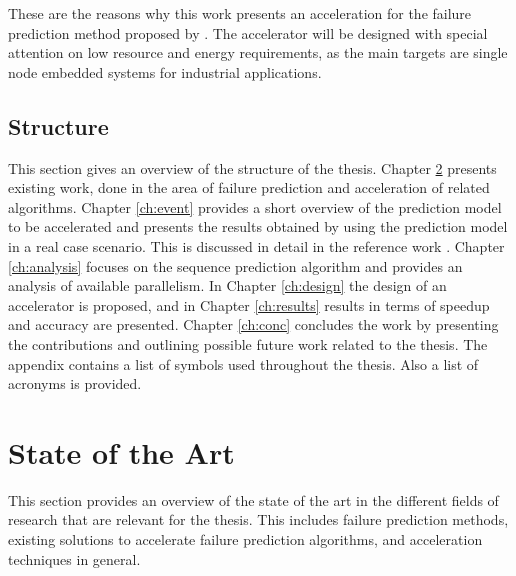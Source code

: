 \documentclass[mscthesis]{usiinfthesis}
\begin{document}
These are the reasons why this work presents an acceleration for the failure
prediction method proposed by \cite{salfner08}. The accelerator will be designed
with special attention on low resource and energy requirements, as the main
targets are single node embedded systems for industrial applications.

\section{Structure}
\label{ch:intro_struct}

This section gives an overview of the structure of the thesis. Chapter
\ref{ch:art} presents existing work, done in the area of failure prediction and
acceleration of related algorithms. Chapter \ref{ch:event} provides a short
overview of the prediction model to be accelerated and presents the results
obtained by using the prediction model in a real case scenario. This is
discussed in detail in the reference work \cite{salfner08}. Chapter
\ref{ch:analysis} focuses on the sequence prediction algorithm and provides an
analysis of available parallelism. In Chapter \ref{ch:design} the design of an
accelerator is proposed, and in Chapter \ref{ch:results} results in terms of
speedup and accuracy are presented. Chapter \ref{ch:conc} concludes the work
by presenting the contributions and outlining possible future work related to
the thesis. The appendix contains a list of symbols used throughout the thesis.
Also a list of acronyms is provided.

\chapter{State of the Art}
\label{ch:art}
\glsresetall %

This section provides an overview of the state of the art in the different
fields of research that are relevant for the thesis. This includes failure
prediction methods, existing solutions to accelerate failure prediction
algorithms, and acceleration techniques in general.

\end{document}
